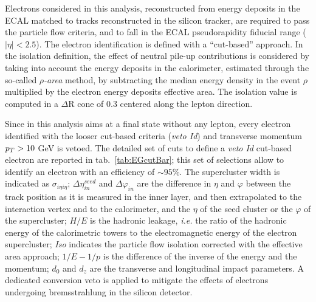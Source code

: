 Electrons considered in this analysis, reconstructed from energy deposits in the ECAL matched to tracks reconstructed in the silicon tracker, are required to pass the particle flow criteria, and to fall in the ECAL pseudorapidity fiducial range ($|\eta|<2.5$). The electron identification is defined with a ``cut-based'' approach. In the isolation definition, the effect of neutral pile-up contributions is considered by taking into account the energy deposits in the calorimeter, estimated through the so-called \emph{$\rho$-area} method, by subtracting the median energy density in the event $\rho$ multiplied by the electron energy deposits effective area. The isolation value is computed in a $\Delta$R cone of 0.3 centered along the lepton direction.

\noindent Since in this analysis aims at a final state without any lepton, every electron identified with the looser cut-based criteria (\emph{veto Id}) and transverse momentum $p_T > 10$ GeV is vetoed. The detailed set of cuts to define a \emph{veto Id} cut-based electron are reported in tab.~\ref{tab:EGcutBar}; this set of selections allow to identify an electron with an efficiency of $\sim 95$\%. The supercluster width is indicated as $\sigma_{i\eta i\eta}$; $\Delta \eta_{in}^{seed}$ and $\Delta \varphi_{in}$ are the difference in $\eta$ and $\varphi$ between the track position as it is measured in the inner layer, and then extrapolated to the interaction vertex and to the calorimeter, and the $\eta$ of the seed cluster or the $\varphi$ of the supercluster; $H/E$ is the hadronic leakage, \textit{i.e.} the ratio of the hadronic energy of the calorimetric towers to the electromagnetic energy of the electron supercluster; \emph{Iso} indicates the particle flow isolation corrected with the effective area approach; $1/E - 1/p$ is the difference of the inverse of the energy and the momentum; $d_0$ and $d_z$ are the transverse and longitudinal impact parameters. A dedicated conversion veto is applied to mitigate the effects of electrons undergoing bremsstrahlung in the silicon detector.

